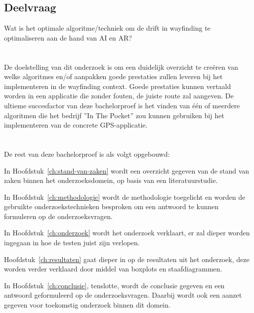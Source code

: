 \subsection{Deelvraag}
Wat is het optimale algoritme/techniek om de drift in wayfinding te optimaliseren aan de hand van AI en AR? 

\section{}
\label{sec:onderzoeksdoelstelling}

De doelstelling van dit onderzoek is om een duidelijk overzicht te creëren van welke algoritmes en/of aanpakken goede prestaties zullen leveren bij het implementeren in de wayfinding context. Goede prestaties kunnen vertaald worden in een applicatie die zonder fouten, de juiste route zal aangeven.
De ultieme succesfactor van deze bachelorproef is het vinden van één of meerdere algoritmen die het bedrijf ''In The Pocket'' zou kunnen gebruiken bij het implementeren van de concrete GPS-applicatie.



\section{}
\label{sec:opzet-bachelorproef}


De rest van deze bachelorproef is als volgt opgebouwd:

In Hoofdstuk~\ref{ch:stand-van-zaken} wordt een overzicht gegeven van de stand van zaken binnen het onderzoeksdomein, op basis van een literatuurstudie.

In Hoofdstuk~\ref{ch:methodologie} wordt de methodologie toegelicht en worden de gebruikte onderzoekstechnieken besproken om een antwoord te kunnen formuleren op de onderzoeksvragen.

In Hoofdstuk~\ref{ch:onderzoek} wordt het onderzoek verklaart, er zal dieper worden ingegaan in hoe de testen juist zijn verlopen.

Hoofdstuk~\ref{ch:resultaten} gaat dieper in op de resultaten uit het onderzoek, deze worden verder verklaard door middel van boxplots en staafdiagrammen.


In Hoofdstuk~\ref{ch:conclusie}, tenslotte, wordt de conclusie gegeven en een antwoord geformuleerd op de onderzoeksvragen. Daarbij wordt ook een aanzet gegeven voor toekomstig onderzoek binnen dit domein.
